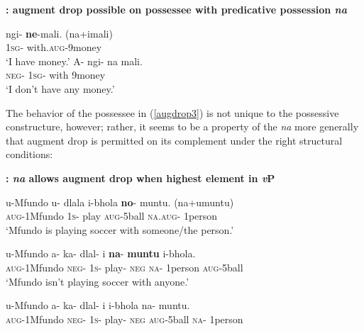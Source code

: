 \documentclass[output=paper,
modfonts
]{langscibook}
\begin{document}
\begin{exe}

\ex\label{augdrop3}\textbf{: augment drop possible on possessee with predicative possession {\it na}}
\begin{xlist}
\ex \gll ngi-  \textbf{ne}-mali. \hfill (na+imali)\\ 
1\textsc{sg}- with.\textsc{aug}-9money\\
\glt `I have money.'
\ex \gll A- ngi- na mali.\\
\textsc{neg}- 1\textsc{sg}- with 9money\\
\glt `I don't have any money.'

\end{xlist}

\end{exe}

The behavior of the possessee in (\ref{augdrop3}) is not unique to the possessive constructure, however; rather, it seems to be a property of the {\it na}  more generally that augment drop is permitted on its complement under the right structural conditions: 

\begin{exe}
\ex\label{P5}\textbf{:  {\it na} allows augment drop when highest element in {\it v}P}\begin{xlist}
\ex\gll  u-Mfundo u- dlala i-bhola \textbf{no}- muntu. \hfill (na+umuntu)\\
\textsc{aug}-1Mfundo 1\textsc{s}- play \textsc{aug}-5ball \textsc{na}.\textsc{aug}- 1person\\
\glt `Mfundo is playing soccer with someone/the person.'

\ex\gll u-Mfundo a- ka- dlal- i  \textbf{na}- \textbf{muntu} i-bhola.\\
\textsc{aug}-1Mfundo \textsc{neg}- 1\textsc{s}- play-  {\textsc{neg}} \textsc{na}- 1person \textsc{aug}-5ball\\
\glt `Mfundo isn't playing soccer with anyone.'

\ex\gll *u-Mfundo a- ka- dlal- i i-bhola na- muntu.\\
\textsc{aug}-1Mfundo \textsc{neg}- 1\textsc{s}- play-  {\textsc{neg}} \textsc{aug}-5ball \textsc{na}- 1person\\


\end{xlist}
\end{exe}
\end{document}
